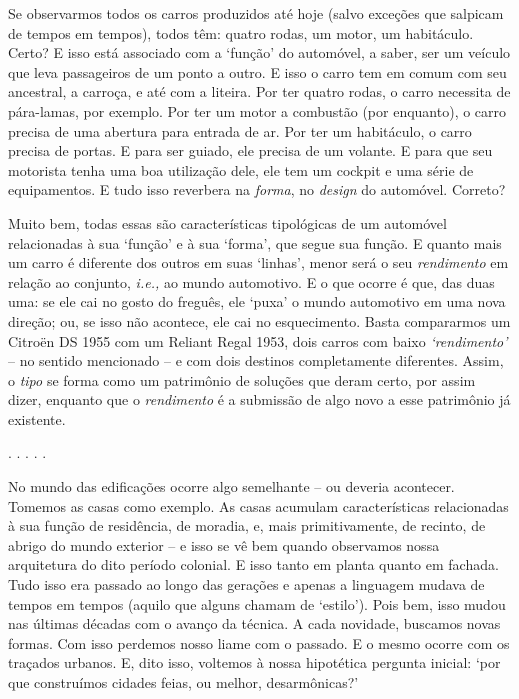 \documentclass[12pt, a4paper]{book} %
\begin{document}
            Se observarmos todos os carros produzidos até hoje (salvo exceções que salpicam de tempos em tempos), todos têm: quatro rodas, um motor, um habitáculo. Certo? E isso está associado com a `função' do automóvel, a saber, ser um veículo que leva passageiros de um ponto a outro. E isso o carro tem em comum com seu ancestral, a carroça, e até com a liteira. Por ter quatro rodas, o carro necessita de pára-lamas, por exemplo. Por ter um motor a combustão (por enquanto), o carro precisa de uma abertura para entrada de ar. Por ter um habitáculo, o carro precisa de portas. E para ser guiado, ele precisa de um volante. E para que seu motorista tenha uma boa utilização dele, ele tem um cockpit e uma série de equipamentos. E tudo isso reverbera na \textit{forma}, no \textit{design} do automóvel. Correto? 

            Muito bem, todas essas são características tipológicas de um automóvel relacionadas à sua `função' e à sua `forma', que segue sua função. E quanto mais um carro é diferente dos outros em suas `linhas', menor será o seu \textit{rendimento} em relação ao conjunto, \textit{i.e.,} ao mundo automotivo. E o que ocorre é que, das duas uma: se ele cai no gosto do freguês, ele `puxa' o mundo automotivo em uma nova direção; ou, se isso não acontece, ele cai no esquecimento. Basta compararmos um Citroën DS 1955 com um Reliant Regal 1953, dois carros com baixo \textit{`rendimento'} – no sentido mencionado – e com dois destinos completamente diferentes. Assim, o \textit{tipo} se forma como um patrimônio de soluções que deram certo, por assim dizer, enquanto que o \textit{rendimento} é a submissão de algo novo a esse patrimônio já existente.
	
	        \begin{center}
		    . . . . .
	        \end{center}

            No mundo das edificações ocorre algo semelhante – ou deveria acontecer. Tomemos as casas como exemplo. As casas acumulam características relacionadas à sua função de residência, de moradia, e, mais primitivamente, de recinto, de abrigo do mundo exterior – e isso se vê bem quando observamos nossa arquitetura do dito período colonial. E isso tanto em planta quanto em fachada. Tudo isso era passado ao longo das gerações e apenas a linguagem mudava de tempos em tempos (aquilo que alguns chamam de `estilo'). Pois bem, isso mudou nas últimas décadas com o avanço da técnica. A cada novidade, buscamos novas formas. Com isso perdemos nosso liame com o passado. E o mesmo ocorre com os traçados urbanos. E, dito isso, voltemos à nossa hipotética pergunta inicial: `por que construímos cidades feias, ou melhor, desarmônicas?' 
\end{document}
